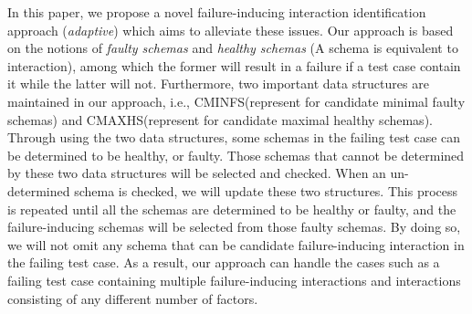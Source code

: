 \documentclass[10pt,journal,cspaper,compsoc]{IEEEtran}
\begin{document}
%



In this paper, we propose a novel failure-inducing interaction identification approach (\emph{adaptive}) which aims to alleviate these issues. Our approach is based on the notions of \emph{faulty schemas} and \emph{healthy schemas} (A schema is equivalent to interaction), among which the former will result in a failure if a test case contain it while the latter will not. Furthermore, two important data structures are maintained in our approach, i.e., CMINFS(represent for candidate minimal faulty schemas) and CMAXHS(represent for candidate maximal healthy schemas). Through using the two data structures, some schemas in the failing test case can be determined to be healthy, or faulty. Those schemas that cannot be determined by these two data structures will be selected and checked. When an un-determined schema is checked, we will update these two structures. This process is repeated until all the schemas are determined to be healthy or faulty, and the failure-inducing schemas will be selected from those faulty schemas. By doing so, we will not omit any schema that can be candidate failure-inducing interaction in the failing test case. As a result, our approach can handle the cases such as a failing test case containing multiple failure-inducing interactions and interactions consisting of any different number of factors.
\end{document}
